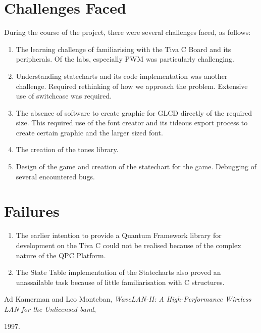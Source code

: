 \documentclass[a4paper,12pt,oneside]{book}
\begin{document}
\section{Challenges Faced}
\qquad During the course of the project, there were several challenges faced, as follows:
\begin{enumerate}
\item The learning challenge of familiarising with the Tiva C Board and its peripherals. Of the labs, especially PWM was particularly challenging.
\item Understanding statecharts and its code implementation was another challenge. Required rethinking of how we approach the problem. Extensive use of switchcase was required.
\item The absence of software to create graphic for GLCD directly of the required size. This required use of the font creator and its tideous export process to create certain graphic and the larger sized font.
\item The creation of the tones library.
\item Design of the game and creation of the statechart for the game. Debugging of several encountered bugs.
\end{enumerate}
\section{Failures}
\begin{enumerate}
\item The earlier intention to provide a Quantum Framework library for development on the Tiva C could not be realised because of the complex nature of the QPC Platform.
\item The State Table implementation of the Statecharts also proved an unassailable task because of little familiarisation with C structures.
\end{enumerate}
\begin{thebibliography}{li}
Ad Kamerman and Leo Monteban,
{\em WaveLAN-II: A High-Performance Wireless LAN for the Unlicensed band},

1997.

\end{thebibliography}
\end{document}
